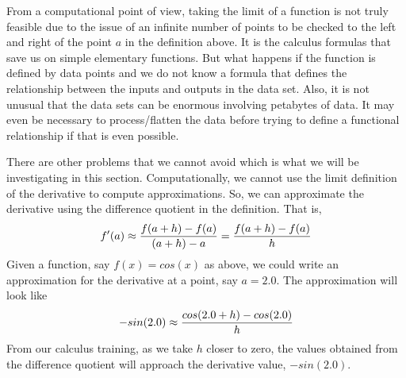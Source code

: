 \documentclass[10pt,fleqn]{article}
\begin{document}
From a computational point of view, taking the limit of a function is not truly
feasible due to the issue of an infinite number of points to be checked to the
left and right of the point \(a\) in the definition above. It is the calculus
formulas that save us on simple elementary functions. But what happens if the
function is defined by data points and we do not know a formula that defines the
relationship between the inputs and outputs in the data set. Also, it is not
unusual that the data sets can be enormous involving petabytes of data. It may
even be necessary to process/flatten the data before trying to define a
functional relationship if that is even possible. 

There are other problems that we cannot avoid which is what we will be
investigating in this section. Computationally, we cannot use the limit
definition of the derivative to compute approximations. So, we can approximate
the derivative using the difference quotient in the definition. That is,
\[
  f'(a) \approx {{f(a+h)-f(a)}\over{(a+h)-a}} = {{f(a+h)-f(a)}\over{h}}
\]
Given a function, say \(f(x)=cos(x)\) as above, we could write an approximation
for the derivative at a point, say \(a=2.0\). The approximation will look like
\[
  -sin(2.0) \approx {{cos(2.0+h)-cos(2.0)}\over{h}}
\]
From our calculus training, as we take \(h\) closer to zero, the values obtained
from the difference quotient will approach the derivative value, \(-sin(2.0)\).
\end{document}
